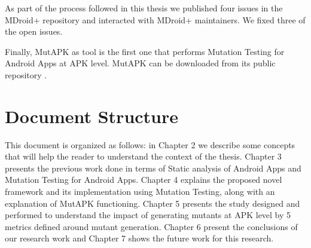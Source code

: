 As part of the process followed in this thesis we published four issues in the MDroid+ repository and interacted with MDroid+ maintainers. We fixed three of the open issues.

Finally, MutAPK as tool is the first one that performs Mutation Testing for Android Apps at APK level. MutAPK can be downloaded from its public repository \cite{MutAPK}.


\section{Document Structure}
This document is organized as follows: in Chapter 2 we describe some concepts that will help the reader to understand the context of the thesis. Chapter 3 presents the previous work done in terms of Static analysis of Android Apps and Mutation Testing for Android Apps. Chapter 4 explains the proposed novel framework and its implementation using Mutation Testing, along with an explanation of MutAPK functioning. Chapter 5 presents the study designed and performed to understand the impact of generating mutants at APK level by 5 metrics defined around mutant generation. Chapter 6 present the conclusions of our research work and Chapter 7 shows the future work for this research.


